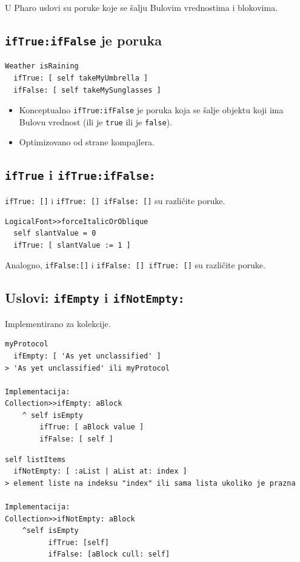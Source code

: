 \documentclass[presentation]{beamer}
\begin{document}
U Pharo uslovi su poruke koje se šalju Bulovim vrednostima i blokovima.

\subsection{\texttt{ifTrue:ifFalse} je poruka}
\label{sec:orgc374fd8}

\begin{verbatim}
Weather isRaining
  ifTrue: [ self takeMyUmbrella ]
  ifFalse: [ self takeMySunglasses ]
\end{verbatim}

\begin{itemize}
\item Konceptualno \texttt{ifTrue:ifFalse} je poruka koja se šalje objektu koji ima Bulovu
vrednost (ili je \texttt{true} ili je \texttt{false}).
\item Optimizovano od strane kompajlera.
\end{itemize}

\subsection{\texttt{ifTrue} i \texttt{ifTrue:ifFalse:}}
\label{sec:org7c13e1e}

\texttt{ifTrue: []} i \texttt{ifTrue: [] ifFalse: []} su različite poruke.

\begin{verbatim}
LogicalFont>>forceItalicOrOblique
  self slantValue = 0
  ifTrue: [ slantValue := 1 ]
\end{verbatim}

Analogno, \texttt{ifFalse:[]} i \texttt{ifFalse: [] ifTrue: []} su različite poruke.

\subsection{Uslovi: \texttt{ifEmpty} i \texttt{ifNotEmpty:}}
\label{sec:orgb4c6949}

Implementirano za kolekcije.

\begin{verbatim}
myProtocol
  ifEmpty: [ 'As yet unclassified' ]
> 'As yet unclassified' ili myProtocol

Implementacija:
Collection>>ifEmpty: aBlock
	^ self isEmpty 
		ifTrue: [ aBlock value ]
		ifFalse: [ self ]
\end{verbatim}

\begin{verbatim}
self listItems
  ifNotEmpty: [ :aList | aList at: index ]
> element liste na indeksu "index" ili sama lista ukoliko je prazna

Implementacija:
Collection>>ifNotEmpty: aBlock
    ^self isEmpty
          ifTrue: [self]
          ifFalse: [aBlock cull: self] 
\end{verbatim}
\end{document}
